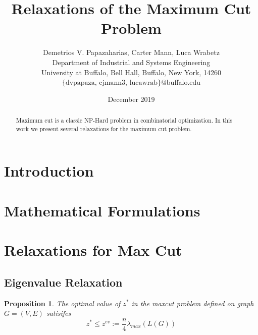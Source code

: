 \documentclass[12pt]{article}
\title{Relaxations of the Maximum Cut Problem}
\author{Demetrios V. Papazaharias, Carter Mann, Luca Wrabetz\\ \small Department of Industrial and Systems Engineering \\
\small University at Buffalo, Bell Hall, Buffalo, New York, 14260\\\small $\lbrace \text{dvpapaza, cjmann3, lucawrab}\rbrace$@buffalo.edu}
\date{December 2019}
\theoremstyle{plain}
\newtheorem{prop}{Proposition}
\theoremstyle{definition}
\begin{document}
\maketitle
\begin{abstract}
    Maximum cut is a classic NP-Hard problem in combinatorial optimization. In this work we present several relaxations for the maximum cut problem. 
\end{abstract}

\clearpage
\section{Introduction}\label{sec:Introduction}
\section{Mathematical Formulations}\label{sec:Formulations}
\section{Relaxations for Max Cut}\label{sec:Relaxations}
\subsection{Eigenvalue Relaxation}\label{subsec:Eigenvalue}

\begin{prop}
The optimal value of $z^*$ in the maxcut problem defined on graph $G=(V,E)$ satisifes
\[
    z^* \leq z^{ev} := \dfrac{n}{4} \lambda_{max}(L(G))
\]
\end{prop}
\end{document}
